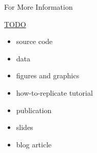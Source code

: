 \appendix

\begin{frame}{For More Information}

\vspace{1ex}

{\HUGE\url{TODO}}

\vspace{3ex}

\begin{itemize}
\item source code
\item data
\item figures and graphics
\item how-to-replicate tutorial
\item publication
\item slides
\item blog article
\end{itemize}

\end{frame}

